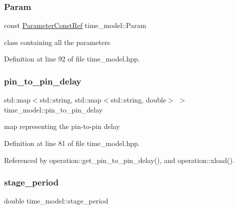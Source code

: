 \mbox{\label{classtime__model_adfd18786156118b7467cef8117933674}} 
\subsubsection{\texorpdfstring{Param}{Param}}
{\footnotesize\ttfamily const \hyperlink{Parameter_8hpp_a37841774a6fcb479b597fdf8955eb4ea}{Parameter\+Const\+Ref} time\+\_\+model\+::\+Param\hspace{0.3cm}{\ttfamily [protected]}}



class containing all the parameters 



Definition at line 92 of file time\+\_\+model.\+hpp.

\mbox{\label{classtime__model_a2472845d03d52d99457ec10a95359715}} 
\subsubsection{\texorpdfstring{pin\+\_\+to\+\_\+pin\+\_\+delay}{pin\_to\_pin\_delay}}
{\footnotesize\ttfamily std\+::map$<$std\+::string, std\+::map$<$std\+::string, double$>$ $>$ time\+\_\+model\+::pin\+\_\+to\+\_\+pin\+\_\+delay}



map representing the pin-\/to-\/pin delay 



Definition at line 81 of file time\+\_\+model.\+hpp.



Referenced by operation\+::get\+\_\+pin\+\_\+to\+\_\+pin\+\_\+delay(), and operation\+::xload().

\mbox{\label{classtime__model_ab7abe2f50afbad1e50d48f2763486615}} 
\subsubsection{\texorpdfstring{stage\+\_\+period}{stage\_period}}
{\footnotesize\ttfamily double time\+\_\+model\+::stage\+\_\+period\hspace{0.3cm}{\ttfamily [protected]}}



